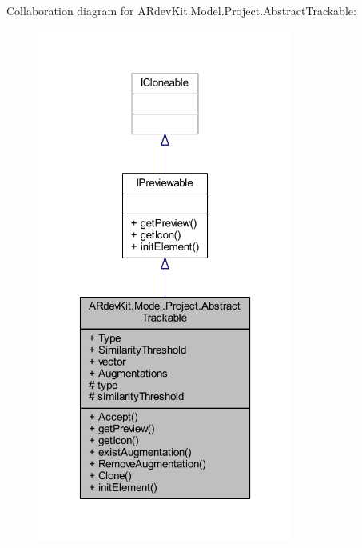 Collaboration diagram for A\-Rdev\-Kit.\-Model.\-Project.\-Abstract\-Trackable\-:
\nopagebreak
\begin{figure}[H]
\begin{center}
\leavevmode
\includegraphics[width=238pt]{class_a_rdev_kit_1_1_model_1_1_project_1_1_abstract_trackable__coll__graph}
\end{center}
\end{figure}

